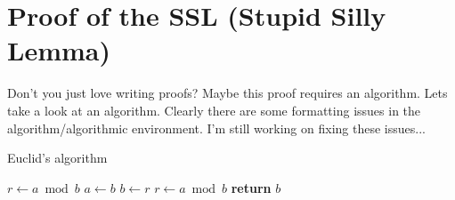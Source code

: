 \chapter{Proof of the SSL (Stupid Silly Lemma)}
Don't you just love writing proofs? Maybe this proof requires an algorithm. Lets take a look at an algorithm. Clearly there are some formatting issues in the algorithm/algorithmic environment. I'm still working on fixing these issues...


\begin{algorithm}
    \label{euclid}
    \caption{Euclid’s algorithm}
    \begin{algorithmic}[1]
            \State $r\gets a\bmod b$
            \State $a\gets b$
            \State $b\gets r$
            \State $r\gets a\bmod b$
            \EndWhile\label{euclidendwhile}
            \State \textbf{return} $b$
            \EndProcedure
    \end{algorithmic}
\end{algorithm}
